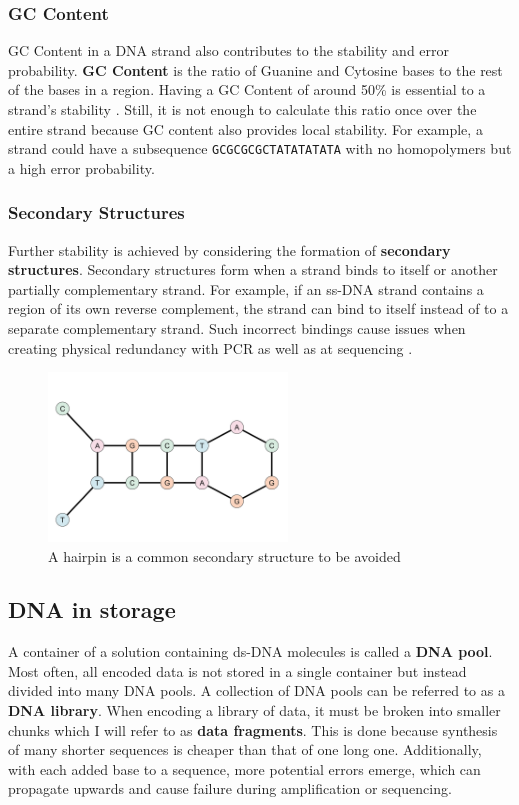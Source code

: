 \documentclass[a4paper,conference]{IEEEtran}
\begin{document}
\subsubsection{GC Content}
GC Content in a DNA strand also contributes to the stability and error probability.  \textbf{GC Content} is the ratio of Guanine and Cytosine bases to the rest of the bases in a region. Having a GC Content of around 50\% is essential to a strand's stability \cite{benita_regionalized_2003}. Still, it is not enough to calculate this ratio once over the entire strand because GC content also provides local stability. For example, a strand could have a subsequence \texttt{GCGCGCGCTATATATATA} with no homopolymers but a high error probability.


\subsubsection{Secondary Structures}
Further stability is achieved by considering the formation of \textbf{secondary structures}. Secondary structures form when a strand binds to itself or another partially complementary strand. For example, if an ss-DNA strand contains a region of its own reverse complement, the strand can bind to itself instead of to a separate complementary strand. Such incorrect bindings cause issues when creating physical redundancy with PCR \cite{kubista_real-time_2006} as well as at sequencing \cite{dong_secondary_2001}.

\begin{figure}[!t]
\centering
\includegraphics[width=2.5in]{images/hairpin}
\caption{A hairpin is a common secondary structure to be avoided}
\label{hairpin}
\end{figure}

\subsection{DNA in storage}
A container of a solution containing ds-DNA molecules is called a \textbf{DNA pool}. Most often, all encoded data is not stored in a single container but instead divided into many DNA pools. A collection of DNA pools can be referred to as a \textbf{DNA library}. When encoding a library of data, it must be broken into smaller chunks which I will refer to as \textbf{data fragments}. This is done because synthesis of many shorter sequences is cheaper than that of one long one. Additionally, with each added base to a sequence, more potential errors emerge, which can propagate upwards and cause failure during amplification or sequencing.
\end{document}
